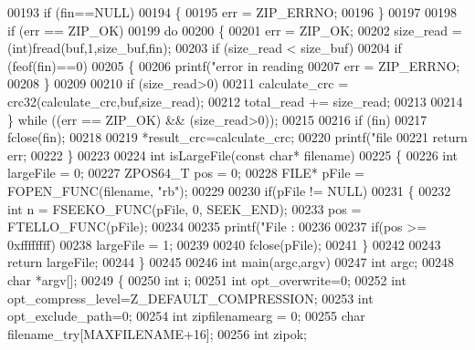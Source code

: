 \begin{DoxyCode}
00193    \textcolor{keywordflow}{if} (fin==NULL)
00194    \{
00195        err = ZIP\_ERRNO;
00196    \}
00197 
00198     \textcolor{keywordflow}{if} (err == ZIP\_OK)
00199         \textcolor{keywordflow}{do}
00200         \{
00201             err = ZIP\_OK;
00202             size\_read = (int)fread(buf,1,size\_buf,fin);
00203             \textcolor{keywordflow}{if} (size\_read < size\_buf)
00204                 \textcolor{keywordflow}{if} (feof(fin)==0)
00205             \{
00206                 printf(\textcolor{stringliteral}{"error in reading %
00207                 err = ZIP\_ERRNO;
00208             \}
00209 
00210             \textcolor{keywordflow}{if} (size\_read>0)
00211                 calculate\_crc = crc32(calculate\_crc,buf,size\_read);
00212             total\_read += size\_read;
00213 
00214         \} \textcolor{keywordflow}{while} ((err == ZIP\_OK) && (size\_read>0));
00215 
00216     \textcolor{keywordflow}{if} (fin)
00217         fclose(fin);
00218 
00219     *result\_crc=calculate\_crc;
00220     printf(\textcolor{stringliteral}{"file %
00221     \textcolor{keywordflow}{return} err;
00222 \}
00223 
00224 \textcolor{keywordtype}{int} isLargeFile(\textcolor{keyword}{const} \textcolor{keywordtype}{char}* filename)
00225 \{
00226   \textcolor{keywordtype}{int} largeFile = 0;
00227   ZPOS64\_T pos = 0;
00228   FILE* pFile = FOPEN\_FUNC(filename, \textcolor{stringliteral}{"rb"});
00229 
00230   \textcolor{keywordflow}{if}(pFile != NULL)
00231   \{
00232     \textcolor{keywordtype}{int} n = FSEEKO\_FUNC(pFile, 0, SEEK\_END);
00233     pos = FTELLO\_FUNC(pFile);
00234 
00235                 printf(\textcolor{stringliteral}{"File : %
00236 
00237     \textcolor{keywordflow}{if}(pos >= 0xffffffff)
00238      largeFile = 1;
00239 
00240                 fclose(pFile);
00241   \}
00242 
00243  \textcolor{keywordflow}{return} largeFile;
00244 \}
00245 
00246 \textcolor{keywordtype}{int} main(argc,argv)
00247     \textcolor{keywordtype}{int} argc;
00248     \textcolor{keywordtype}{char} *argv[];
00249 \{
00250     \textcolor{keywordtype}{int} i;
00251     \textcolor{keywordtype}{int} opt\_overwrite=0;
00252     \textcolor{keywordtype}{int} opt\_compress\_level=Z\_DEFAULT\_COMPRESSION;
00253     \textcolor{keywordtype}{int} opt\_exclude\_path=0;
00254     \textcolor{keywordtype}{int} zipfilenamearg = 0;
00255     \textcolor{keywordtype}{char} filename\_try[MAXFILENAME+16];
00256     \textcolor{keywordtype}{int} zipok;
}}}
\end{DoxyCode}
